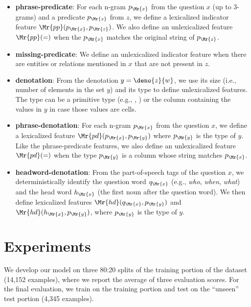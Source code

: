 \begin{itemize}

\item \textbf{phrase-predicate}:
For each n-gram $p_\Mr{x}$ from the question $x$
(up to 3-grams)
and a predicate $p_\Mr{z}$ from $z$,
we define a lexicalized
indicator feature
$\Mr{pp}(p_\Mr{x}, p_\Mr{z})$.
We also define an unlexicalized feature
$\Mr{pp}(=)$
when the $p_\Mr{x}$ matches the original string of $p_\Mr{z}$.

\item \textbf{missing-predicate}:
We define an unlexicalized indicator feature
when there are entities or relations mentioned in $x$
that are not present in $z$.

\item \textbf{denotation}:
From the denotation $y = \deno{z}{w}$,
we use its size (i.e., number of elements in the set $y$)
and its type to define unlexicalized features.
The type can be a primitive type (e.g., , )
or the column containing the values in $y$
in case those values are cells.

\item \textbf{phrase-denotation}:
For each n-gram $p_\Mr{x}$ from the question $x$,
we define a lexicalized feature $\Mr{pd}(p_\Mr{x}, p_\Mr{y})$
where $p_\Mr{y}$ is the type of $y$.
Like the phrase-predicate features,
we also define an unlexicalized feature
$\Mr{pd}(=)$
when the type $p_\Mr{y}$ is a column whose string matches $p_\Mr{x}$.

\item \textbf{headword-denotation}:
From the part-of-speech tags of the question $x$,
we deterministically identify the question word $q_\Mr{x}$
(e.g., \emph{who}, \emph{when}, \emph{what})
and the head word $h_\Mr{x}$
(the first noun after the question word).
We then define lexicalized features $\Mr{hd}(q_\Mr{x}, p_\Mr{y})$
and $\Mr{hd}(h_\Mr{x}, p_\Mr{y})$,
where $p_\Mr{y}$ is the type of $y$.
\end{itemize}

\section{Experiments}
We develop our model on three 80:20 splits
of the training portion of the \wtq dataset (14,152 examples),
where we report the average of three evaluation scores.
For the final evaluation,
we train on the training portion and 
test on the ``unseen'' test portion
(4,345 examples).

